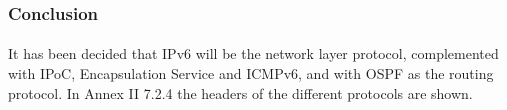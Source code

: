 \subsubsection{Conclusion}
\paragraph{}It has been decided that IPv6 will be the network layer protocol, complemented with IPoC, Encapsulation Service and ICMPv6, and with OSPF as the routing protocol. In Annex II 7.2.4 the headers of the different protocols are shown. 
